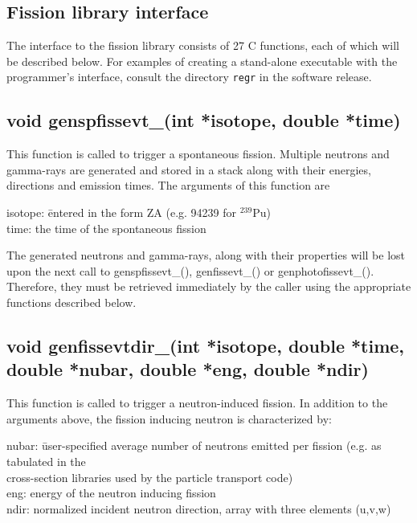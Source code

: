 \pagebreak
\subsection{Fission library interface}\label{sec:api}

The interface to the fission library consists of 27 C functions, each of which will be described below. For examples of creating a stand-alone executable with the programmer's interface, consult the directory \texttt{regr} in the software release.

\subsection*{void genspfissevt\_(int *isotope, double *time)}
This function is called to trigger a spontaneous fission. Multiple neutrons and gamma-rays are generated and stored in a stack along with their energies, directions and emission times. The arguments of this function are

\begin{tabbing}
\indent isotope: \=entered in the form ZA (e.g. 94239 for $^{239}$Pu) \\
\indent time: \> the time of the spontaneous fission \\
\end{tabbing}

The generated neutrons and gamma-rays, along with their properties will be lost upon the next call to genspfissevt\_(),
genfissevt\_() or genphotofissevt\_(). Therefore, they must be retrieved immediately by the caller using the appropriate 
functions described below.

\subsection*{void genfissevtdir\_(int *isotope, double *time, double *nubar, double *eng, double *ndir)}
This function is called to trigger a neutron-induced fission. In addition to the arguments above, the fission inducing neutron
is characterized by:

\begin{tabbing}
\indent nubar: \= user-specified average number of neutrons emitted per fission (e.g. as tabulated in the \\ 
\> cross-section libraries used by the particle transport code) \\
\indent eng: \> energy of the neutron inducing fission \\
\indent ndir: \> normalized incident neutron direction, array with three elements (u,v,w) \\
\end{tabbing}


